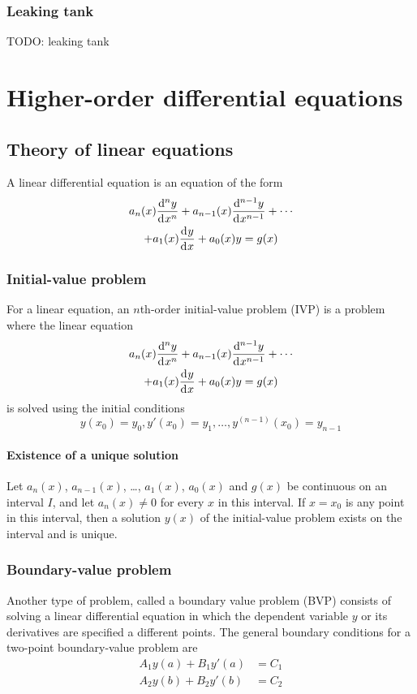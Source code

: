 \documentclass[10pt, twocolumn]{article}
\theoremstyle{definition}
\begin{document}
\subsubsection*{Leaking tank}
TODO: leaking tank


\section{Higher-order differential equations}
\subsection{Theory of linear equations}
A linear differential equation is an equation of the form
\begin{multline*}
  a_n (x)\frac{\mathrm{d}^{n} y}{\mathrm{d}^{} x^{n}} + a_{n - 1}(x)\frac{\mathrm{d}^{n - 1} y}{\mathrm{d}^{} x^{n - 1}} + \cdots \\
  + a_1 (x)\frac{\mathrm{d}^{} y}{\mathrm{d}^{} x} + a_0 (x)y = g(x)
\end{multline*}


\subsubsection*{Initial-value problem}
For a linear equation, an \(n\)th-order initial-value problem (IVP) is a problem where the linear equation
\begin{multline*}
  a_n (x)\frac{\mathrm{d}^{n} y}{\mathrm{d}^{} x^{n}} + a_{n - 1}(x)\frac{\mathrm{d}^{n - 1} y}{\mathrm{d}^{} x^{n - 1}} + \cdots \\
  + a_1 (x)\frac{\mathrm{d}^{} y}{\mathrm{d}^{} x} + a_0 (x)y = g(x)
\end{multline*}
is solved using the initial conditions
\[
  y(x_0 ) = y_0 , y'(x_0 ) = y_1 , \dots, y^{(n - 1)}(x_0 ) = y_{n - 1}
\]

\paragraph*{Existence of a unique solution}
Let \(a_n(x)\), \(a_{n - 1}(x)\), \dots, \(a_1 (x)\), \(a_0 (x)\) and \(g(x)\) be continuous on an interval \(I\), and let \(a_n(x) \neq 0\) for every \(x\) in this interval.
If \(x = x_0 \) is any point in this interval, then a solution \(y(x)\) of the initial-value problem exists on the interval and is unique.


\subsubsection*{Boundary-value problem}
Another type of problem, called a boundary value problem (BVP) consists of solving a linear differential equation in which the dependent variable \(y\) or its derivatives are specified a different points.
The general boundary conditions for a two-point boundary-value problem are
\begin{align*}
  A_1 y(a) + B_1 y'(a) & = C_1 \\
  A_2 y(b) + B_2 y'(b) & = C_2 \\
\end{align*}
\end{document}
